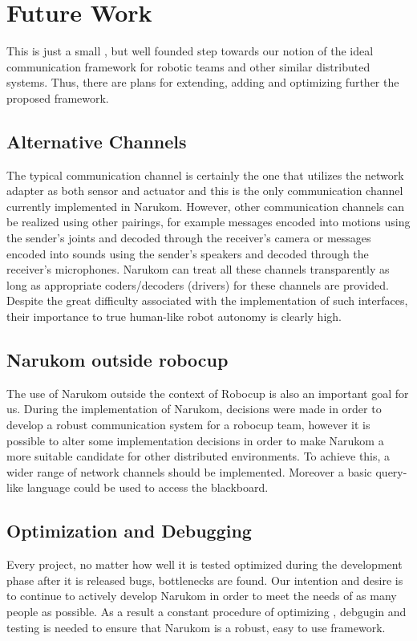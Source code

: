 \chapter{Future Work}
\label{future}
This is just a small , but well founded step towards our notion of the ideal communication framework for robotic teams and other similar distributed systems. Thus, there are plans for extending, adding and optimizing further the proposed framework.
\section{Alternative Channels}
The typical communication channel is certainly the one that utilizes the network adapter as both sensor and actuator and this is the only communication channel currently implemented in Narukom. However, other communication channels can be realized using other pairings, for example messages encoded into motions using the sender's joints and decoded through the receiver's camera  or messages encoded into sounds using the sender's speakers and decoded through the receiver's microphones. Narukom can treat all these channels transparently as long as appropriate coders/decoders (drivers) for these channels are provided. Despite the great difficulty associated with the implementation of such interfaces, their importance to true human-like robot autonomy is clearly high.

\section{Narukom outside robocup}
The use of Narukom outside the context of Robocup is also an important goal for us. During the implementation of Narukom, decisions were made in order to develop a robust communication system for a robocup team, however it is possible to alter some implementation decisions in order to make Narukom a more suitable candidate for other distributed environments. To achieve this, a wider range of network channels should be implemented. Moreover a basic query-like language could be used to access the blackboard.

\section{Optimization and Debugging}

Every project, no matter how well it is tested optimized during the development phase after it is released bugs, bottlenecks are found. Our intention and desire is to continue to actively develop Narukom in order to meet the needs of as many people as possible. As a result a constant procedure of optimizing , debgugin and testing is needed to ensure that Narukom is a robust, easy to use framework.